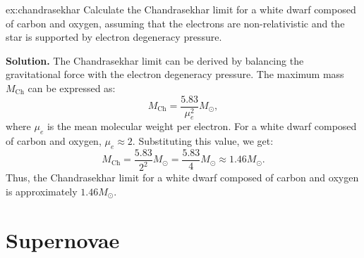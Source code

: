 \begin{example}{}{ex:chandrasekhar}
Calculate the Chandrasekhar limit for a white dwarf composed of carbon and oxygen, assuming that the electrons are non-relativistic and the star is supported by electron degeneracy pressure.  

\smallskip\textbf{Solution.}
The Chandrasekhar limit can be derived by balancing the gravitational force with the electron degeneracy pressure. The maximum mass $M_{\text{Ch}}$ can be expressed as:
\begin{equation}
M_{\text{Ch}} = \frac{5.83}{\mu_e^2} M_\odot,
\end{equation}
where $\mu_e$ is the mean molecular weight per electron. For a white dwarf composed of carbon and oxygen, $\mu_e \approx 2$. Substituting this value, we get:
\begin{equation}
M_{\text{Ch}} = \frac{5.83}{2^2} M_\odot = \frac{5.83}{4} M_\odot \approx 1.46 M_\odot.
\end{equation}  
Thus, the Chandrasekhar limit for a white dwarf composed of carbon and oxygen is approximately $1.46 M_\odot$.
\end{example}

\section{Supernovae}